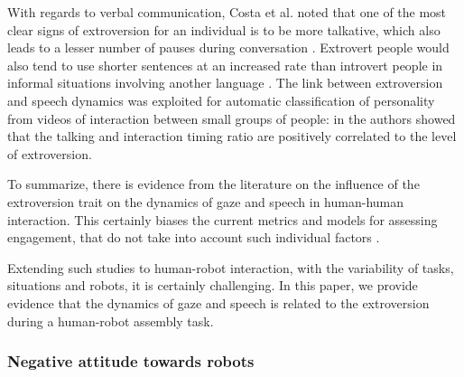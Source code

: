 With regards to verbal communication, Costa et al. \cite{NEOPIR1998} noted that one of the most clear signs of extroversion for an individual is to be more talkative, which also leads to a lesser number of pauses during conversation \cite{Scherer1981}. Extrovert people would also tend to use shorter sentences at an increased rate than introvert people in informal situations involving another language \cite{Dewaele00}. 
The link between extroversion and speech dynamics was exploited for automatic classification of personality from videos of interaction between small groups of people: in \cite{Pianesi08,Lepri2010} the authors showed that the talking and interaction timing ratio are positively correlated to the level of extroversion.

To summarize, there is evidence from the literature on the influence of the extroversion trait on the dynamics of gaze and speech in human-human interaction. This certainly biases the current metrics and models for assessing engagement, that do not take into account such individual factors \cite{Anzalone2015engagement,rich2010recognizing}. 

Extending such studies to human-robot interaction, with the variability of tasks, situations and robots, it is certainly challenging. In this paper, we provide evidence that the dynamics of gaze and speech is related to the extroversion during a human-robot assembly task.





\subsubsection{Negative attitude towards robots}


